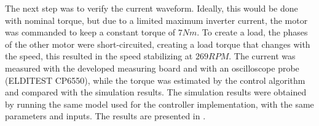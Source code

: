 \documentclass[9pt,conference]{IEEEtran}
\begin{document}
The next step was to verify the current waveform. Ideally, this would be done with nominal torque, but due to a limited maximum inverter current, the motor was commanded to keep a constant torque of $7Nm$. To create a load, the phases of the other motor were short-circuited, creating a load torque that changes with the speed, this resulted in the speed stabilizing at $269RPM$. The current was measured with the developed measuring board and with an oscilloscope probe (ELDITEST CP6550), while the torque was estimated by the control algorithm and compared with the simulation results. The simulation results were obtained by running the same model used for the controller implementation, with the same parameters and inputs. The results are presented in .
\end{document}
